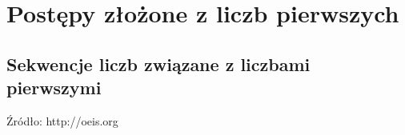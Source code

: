 \documentclass[10pt,onecolumn]{article}
\theoremstyle{definition}
\theoremstyle{hypothesis}
\theoremstyle{capability}
\begin{document}
\newpage


\section{Postępy złożone z liczb pierwszych}

\newpage


\begin{landscape}

\section{Sekwencje liczb związane z liczbami pierwszymi}

Źródło: http://oeis.org


\end{landscape}
\end{document}

